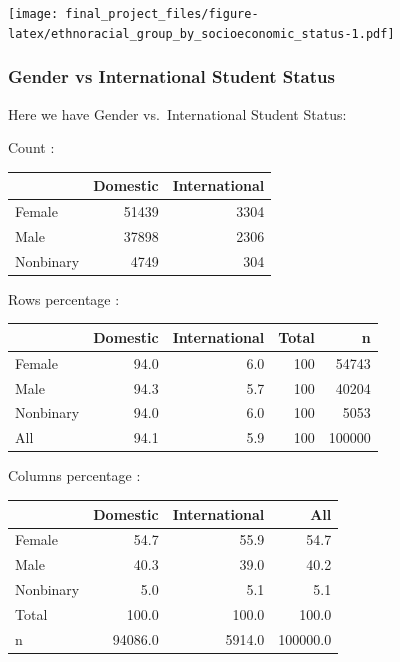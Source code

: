 \documentclass[
  twocolumn]{article}
\newenvironment{Shaded}{\begin{snugshade}}{\end{snugshade}}
\newcommand{\FunctionTok}[1]{\textcolor[rgb]{0.13,0.29,0.53}{\textbf{#1}}}
\newcommand{\NormalTok}[1]{#1}
\newcommand{\SpecialCharTok}[1]{\textcolor[rgb]{0.81,0.36,0.00}{\textbf{#1}}}
\begin{document}
\texttt{[image: final\_project\_files/figure-latex/ethnoracial\_group\_by\_socioeconomic\_status-1.pdf]}

\subsubsection{Gender vs International Student
Status}\label{gender-vs-international-student-status}

Here we have Gender vs.~International Student Status:

\begin{Shaded}
\end{Shaded}

Count :

\begin{longtable}[]{@{}lrr@{}}
\toprule\noalign{}
& Domestic & International \\
\midrule\noalign{}
\endhead
\bottomrule\noalign{}
\endlastfoot
Female & 51439 & 3304 \\
Male & 37898 & 2306 \\
Nonbinary & 4749 & 304 \\
\end{longtable}

Rows percentage :

\begin{longtable}[]{@{}lrrrr@{}}
\toprule\noalign{}
& Domestic & International & Total & n \\
\midrule\noalign{}
\endhead
\bottomrule\noalign{}
\endlastfoot
Female & 94.0 & 6.0 & 100 & 54743 \\
Male & 94.3 & 5.7 & 100 & 40204 \\
Nonbinary & 94.0 & 6.0 & 100 & 5053 \\
All & 94.1 & 5.9 & 100 & 100000 \\
\end{longtable}

Columns percentage :

\begin{longtable}[]{@{}lrrr@{}}
\toprule\noalign{}
& Domestic & International & All \\
\midrule\noalign{}
\endhead
\bottomrule\noalign{}
\endlastfoot
Female & 54.7 & 55.9 & 54.7 \\
Male & 40.3 & 39.0 & 40.2 \\
Nonbinary & 5.0 & 5.1 & 5.1 \\
Total & 100.0 & 100.0 & 100.0 \\
n & 94086.0 & 5914.0 & 100000.0 \\
\end{longtable}
\end{document}
